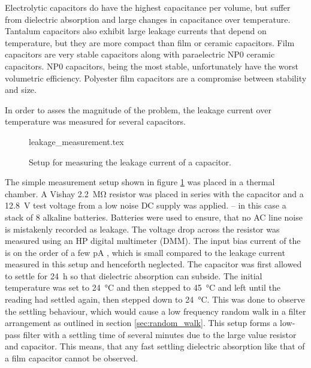 Electrolytic capacitors do have the highest capacitance per volume, but suffer from dielectric absorption and large changes in capacitance over temperature. Tantalum capacitors also exhibit large leakage currents \cite{tantalum_leakage} that depend on temperature, but they are more compact than film or ceramic capacitors. Film capacitors are very stable capacitors along with paraelectric NP0 ceramic capacitors. NP0 capacitors, being the most stable, unfortunately have the worst volumetric efficiency. Polyester film capacitors are a compromise between stability and size.

In order to asses the magnitude of the problem, the leakage current over temperature was measured for several capacitors.
\begin{figure}[ht]
    \centering
        {leakage_measurement.tex}
    \caption{Setup for measuring the leakage current of a capacitor.}
    \label{fig:capacitor_leakage_measurement}
\end{figure}

The simple measurement setup shown in figure \ref{fig:capacitor_leakage_measurement} was placed in a thermal chamber. A Vishay  \qty{2.2}{\mega\ohm} resistor was placed in series with the capacitor and a \qty{12.8}{\V} test voltage from a low noise DC supply was applied. -- in this case a stack of \num{8} alkaline batteries. Batteries were used to ensure, that no AC line noise is mistakenly recorded as leakage. The voltage drop across the resistor was measured using an HP  digital multimeter (DMM). The input bias current of the  is on the order of a few \unit{\pA} \cite{article_3458A_input_impedance, article_3458A_input_impedance_3}, which is small compared to the leakage current measured in this setup and henceforth neglected. The capacitor was first allowed to settle for \qty{24}{\hour} so that dielectric absorption can subside. The initial temperature was set to \qty{24}{\celsius} and then stepped to \qty{45}{\celsius} and left until the reading had settled again, then stepped down to \qty{24}{\celsius}. This was done to observe the settling behaviour, which would cause a low frequency random walk in a filter arrangement as outlined in section \ref{sec:random_walk}. This setup forms a low-pass filter with a settling time of several minutes due to the large value resistor and capacitor. This means, that any fast settling dielectric absorption like that of a film capacitor cannot be observed.

